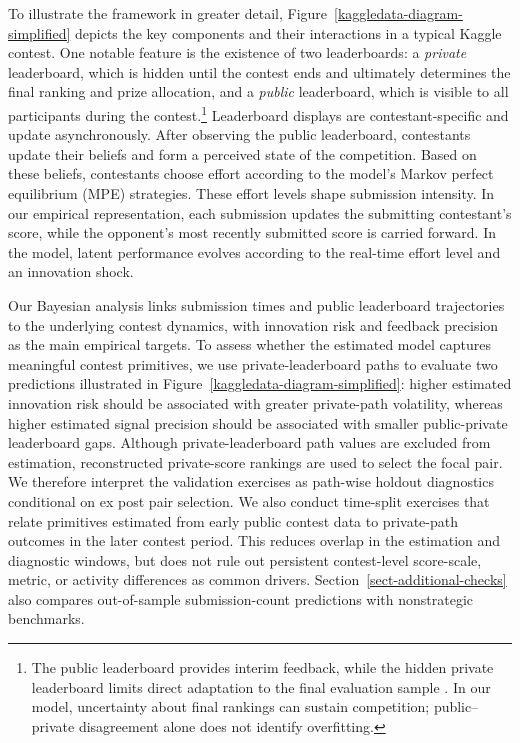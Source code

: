 \documentclass[mnsc]{informs3}
\begin{document}
To illustrate the framework in greater detail, Figure~\ref{kaggledata-diagram-simplified} depicts the key components and their interactions in a typical Kaggle contest.
One notable feature is the existence of two leaderboards: a \textit{private} leaderboard, which is hidden until the contest ends and ultimately determines the final ranking and prize allocation, and a \textit{public} leaderboard, which is visible to all participants during the contest.\footnote{
The public leaderboard provides interim feedback, while the hidden private leaderboard limits direct adaptation to the final evaluation sample \citep[see also][]{blum2015ladder}. In our model, uncertainty about final rankings can sustain competition; public--private disagreement alone does not identify overfitting.
}
Leaderboard displays are contestant-specific and update asynchronously.
After observing the public leaderboard, contestants update their beliefs and form a perceived state of the competition.
Based on these beliefs, contestants choose effort according to the model’s Markov perfect equilibrium (MPE) strategies.
These effort levels shape submission intensity. 
In our empirical representation, each submission updates the submitting contestant's score, while the opponent's most recently submitted score is carried forward.
In the model, latent performance evolves according to the real-time effort level and an innovation shock.


Our Bayesian analysis links submission times and public leaderboard trajectories to the underlying contest dynamics, with innovation risk and feedback precision as the main empirical targets.
To assess whether the estimated model captures meaningful contest primitives, we use private-leaderboard paths to evaluate two predictions illustrated in Figure~\ref{kaggledata-diagram-simplified}: 
higher estimated innovation risk should be associated with greater private-path volatility, 
whereas higher estimated signal precision should be associated with smaller public-private leaderboard gaps. 
Although private-leaderboard path values are excluded from estimation, reconstructed private-score rankings are used to select the focal pair. We therefore interpret the validation exercises as path-wise holdout diagnostics conditional on ex post pair selection.
We also conduct time-split exercises that relate primitives estimated from early public contest data to private-path outcomes in the later contest period. This reduces overlap in the estimation and diagnostic windows, but does not rule out persistent contest-level score-scale, metric, or activity differences as common drivers. Section~\ref{sect-additional-checks} also compares out-of-sample submission-count predictions with nonstrategic benchmarks.
\end{document}
